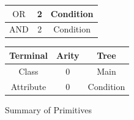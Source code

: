\documentclass[a4paper,12pt]{article}
\begin{document}
{\begin{figure}[h!]
\begin{minipage}[c]{0.5\textwidth}
\begin{tabular}{|c|c|c|}
                            $\text{OR}$ & 2 & Condition \\
                            \hline
                            $\text{AND}$ & 2 & Condition \\
                            \hline
                        \end{tabular}
                    \end{minipage}
                    \begin{minipage}[c]{0.5\textwidth}
                        \centering
                        \begin{tabular}{|c|c|c|}
                            \hline
                            \textbf{Terminal} & \textbf{Arity} & \textbf{Tree}\\
                            \hline
                            Class & 0 & Main \\
                            \hline
                            Attribute & 0 & Condition  \\
                            \hline  
                        \end{tabular}
                    \end{minipage}
                    \caption{Summary of Primitives}
                \end{figure} 
            }
        \newpage
\end{document}
